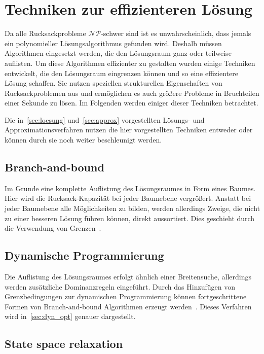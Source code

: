 \documentclass[12pt, a4paper, ngerman]{article}
\begin{document}
\section{Techniken zur effizienteren Lösung}

Da alle Rucksackprobleme \(\mathcal{NP}\)-schwer sind ist es unwahrscheinlich,
dass jemals ein polynomieller Lösungsalgorithmus gefunden wird.
Deshalb müssen Algorithmen eingesetzt werden,
die den Lösungsraum ganz oder teilweise auflisten.
Um diese Algorithmen effizienter zu gestalten wurden einige Techniken entwickelt,
die den Lösungsraum eingrenzen können und so eine effizientere Lösung schaffen.
Sie nutzen speziellen strukturellen Eigenschaften von Rucksackproblemen aus
und ermöglichen es auch größere Probleme in Bruchteilen einer Sekunde zu lösen.
Im Folgenden werden einiger dieser Techniken betrachtet.

Die in~\ref{sec:loesung} und~\ref{sec:approx} vorgestellten Lösungs- und Approximationsverfahren
nutzen die hier vorgestellten Techniken entweder oder können durch sie noch weiter beschleunigt werden.

\subsection{Branch-and-bound}

Im Grunde eine komplette Auflistung des Lösungsraumes in Form eines Baumes.
Hier wird die Rucksack-Kapazität bei jeder Baumebene vergrößert.
Anstatt bei jeder Baumebene alle Möglichkeiten zu bilden,
werden allerdings Zweige,
die nicht zu einer besseren Lösung führen können,
direkt aussortiert.
Dies geschieht durch die Verwendung von Grenzen~\cite{algos_knapsack}.

\subsection{Dynamische Programmierung}

Die Auflistung des Lösungsraumes erfolgt ähnlich einer Breitensuche,
allerdings werden zusätzliche Dominanzregeln eingeführt.
Durch das Hinzufügen von Grenzbedingungen zur dynamischen Programmierung
können fortgeschrittene Formen von Branch-and-bound Algorithmen erzeugt werden~\cite{algos_knapsack}.
Dieses Verfahren wird in~\ref{sec:dyn_opt} genauer dargestellt.

\subsection{State space relaxation}
\end{document}
